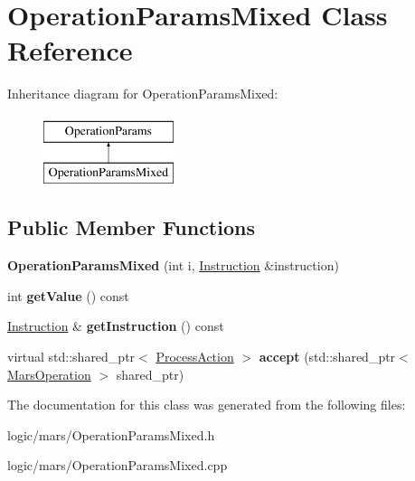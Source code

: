 \hypertarget{classOperationParamsMixed}{}\section{Operation\+Params\+Mixed Class Reference}
\label{classOperationParamsMixed}
Inheritance diagram for Operation\+Params\+Mixed\+:\begin{figure}[H]
\begin{center}
\leavevmode
\includegraphics[height=2.000000cm]{classOperationParamsMixed}
\end{center}
\end{figure}
\subsection*{Public Member Functions}
\begin{DoxyCompactItemize}
\item 
\mbox{\label{classOperationParamsMixed_ad92325a7406f3e25f2f336a0b5a88010}} 
{\bfseries Operation\+Params\+Mixed} (int i, \hyperlink{classInstruction}{Instruction} \&instruction)
\item 
\mbox{\label{classOperationParamsMixed_ae3df5950117f18772921a40c99a171ad}} 
int {\bfseries get\+Value} () const
\item 
\mbox{\label{classOperationParamsMixed_a292c8725276f1b652e781d0c9e9e4f34}} 
\hyperlink{classInstruction}{Instruction} \& {\bfseries get\+Instruction} () const
\item 
\mbox{\label{classOperationParamsMixed_a44a93f4dc877f4ee1b1deeb83961a519}} 
virtual std\+::shared\+\_\+ptr$<$ \hyperlink{classProcessAction}{Process\+Action} $>$ {\bfseries accept} (std\+::shared\+\_\+ptr$<$ \hyperlink{classMarsOperation}{Mars\+Operation} $>$ shared\+\_\+ptr)
\end{DoxyCompactItemize}


The documentation for this class was generated from the following files\+:\begin{DoxyCompactItemize}
\item 
logic/mars/Operation\+Params\+Mixed.\+h\item 
logic/mars/Operation\+Params\+Mixed.\+cpp\end{DoxyCompactItemize}
